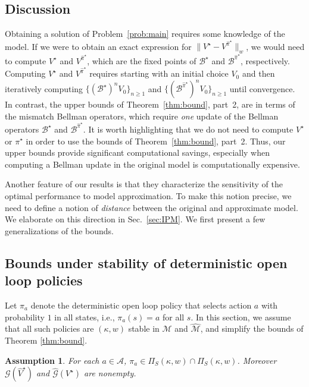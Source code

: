 \documentclass[letterpaper, 10pt]{IEEEtran}
\newtheorem{assumption}{Assumption}
\newcommand*\ALPHABET{\mathcal}
\newcommand*\BELLMAN{\mathscr{B}}
\newcommand*\tuple{\kappa, w}
\begin{document}
\subsection{Discussion} \label{sec:discussion}
Obtaining a solution of Problem~\ref{prob:main} requires some knowledge of the model. If we were to obtain an exact expression for $\|V^{\star} - V^{\hat \pi^\star} \|_w$, we would need to compute $V^\star$ and $V^{\hat \pi^\star}$, which are the fixed points of $\BELLMAN^\star$ and $\BELLMAN^{\hat \pi^\star}$, respectively. Computing $V^\star$ and $V^{\hat \pi^\star}$ requires starting with an initial choice $V_0$ and then iteratively computing $\{(\BELLMAN^\star)^n V_0\}_{n \ge 1}$ and $\{(\BELLMAN^{\hat \pi^\star})^n V_0\}_{n \ge 1}$ until convergence. In contrast, the upper bounds of Theorem~\ref{thm:bound}, part~2, are in terms of the mismatch Bellman operators, which require \emph{one} update of the Bellman operators $\BELLMAN^{\star}$ and $\BELLMAN^{\hat \pi^\star}$. It is worth highlighting that we do not need to compute $V^\star$ or $\pi^\star$ in order to use the bounds of Theorem~\ref{thm:bound}, part~2.
Thus, our upper bounds provide significant computational savings, especially when computing a Bellman update in the original model is computationally expensive.  

Another feature of our results is that they characterize the sensitivity of the optimal performance to model approximation. To make this notion precise, we need to define a notion of \emph{distance} between the original and approximate model. We elaborate on this direction in Sec.~\ref{sec:IPM}. We first present a few generalizations of the bounds.

\subsection{Bounds under stability of deterministic open loop policies}
Let $\pi_a$ denote the deterministic open loop policy that selects action $a$ with probability $1$ in all states, i.e., $\pi_a(s) =a$ for all $s$. In this section, we assume that all such policies are $(\tuple)$ stable in $ {\ALPHABET M}$ and $\hat {\ALPHABET M}$, and simplify the  bounds of Theorem \ref{thm:bound}.
\begin{assumption}\label{assm:openloop}
For each $a \in \ALPHABET A$,  $\pi_a \in \Pi_S(\tuple) \cap \hat \Pi_S(\tuple)$.
Moreover $\ALPHABET G(\hat V^\star)$ and $\hat {\ALPHABET G}(V^\star)$ are nonempty.
\end{assumption}
\end{document}
